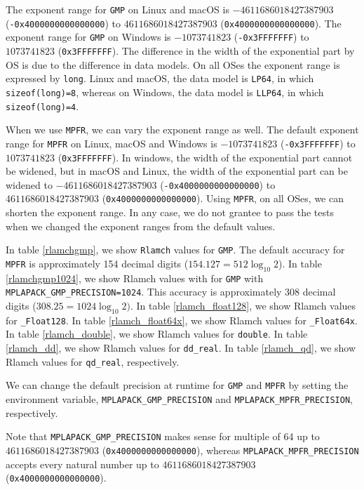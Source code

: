 \documentclass[12pt]{article}
\begin{document}
The exponent range for {\tt GMP} on Linux and macOS is $-4611686018427387903$ ({\tt -0x4000000000000000}) to $4611686018427387903$ ({\tt 0x4000000000000000}).
The  exponent range for {\tt GMP} on Windows is $-1073741823$ ({\tt -0x3FFFFFFF}) to $1073741823$ ({\tt 0x3FFFFFFF}). The difference in the width of the exponential part by OS is due to the difference in data models. On all OSes the exponent range is expressed by {\tt long}. Linux and macOS, the data model is {\tt LP64}, in which {\tt sizeof(long)=8}, whereas on Windows, the data model is {\tt LLP64}, in which {\tt sizeof(long)=4}.

When we use {\tt MPFR}, we can vary the exponent range as well. The default exponent range for {\tt MPFR} on Linux, macOS and Windows is $-1073741823$ ({\tt -0x3FFFFFFF}) to $1073741823$ ({\tt 0x3FFFFFFF}). In windows, the width of the exponential part cannot be widened, but in macOS and Linux, the width of the exponential part can be widened to $-4611686018427387903$ ({\tt -0x4000000000000000}) to $4611686018427387903$ ({\tt 0x4000000000000000}). Using {\tt MPFR}, on all OSes, we can shorten the exponent range.
In any case, we do not grantee to pass the tests when we changed the exponent ranges from the default values.

In table \ref{rlamchgmp}, we show {\tt Rlamch} values for {\tt GMP}. The default accuracy for {\tt MPFR} is approximately 154 decimal digits ($154.127 =512 \log_{10}2$).
In table \ref{rlamchgmp1024}, we show Rlamch values with for {\tt GMP} with {\tt MPLAPACK\_GMP\_PRECISION=1024}. This accuracy is approximately 308 decimal digits ($308.25 = 1024 \log_{10}2)$.
In table \ref{rlamch_float128}, we show Rlamch values for {\tt \_Float128}.
In table \ref{rlamch_float64x}, we show Rlamch values for {\tt \_Float64x}.
In table \ref{rlamch_double}, we show Rlamch values for {\tt double}.
In table \ref{rlamch_dd}, we show Rlamch values for {\tt dd\_real}.
In table \ref{rlamch_qd}, we show Rlamch values for {\tt qd\_real}, respectively.

We can change the default precision at runtime for {\tt GMP} and {\tt MPFR} by setting the environment variable,
{\tt MPLAPACK\_GMP\_PRECISION} and {\tt MPLAPACK\_MPFR\_PRECISION}, respectively.

Note that {\tt MPLAPACK\_GMP\_PRECISION} makes sense for multiple of 64 up to  $4611686018427387903$ ({\tt 0x4000000000000000}), whereas {\tt MPLAPACK\_MPFR\_PRECISION} accepts every natural number up to $4611686018427387903$ ({\tt 0x4000000000000000}).
\end{document}
